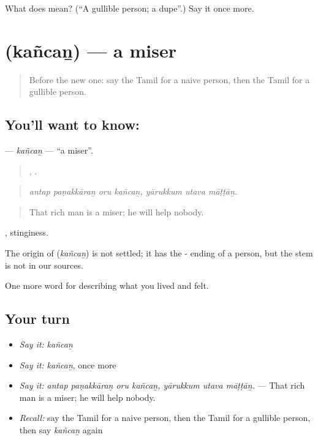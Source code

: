 \begin{tcolorbox}[breakable,colback=teal!4,colframe=teal!35!black,title={Before you move on}]
What does  mean? (\textquotedblleft{}A gullible person; a dupe\textquotedblright{}.) Say it once more.
\end{tcolorbox}
\section[\texorpdfstring{\ta{கஞ்சன்} (kañcaṉ)}{கஞ்சன் (kañcaṉ)}]{ (kañcaṉ) — a miser}

\label{lesson:TA-C472-kancan}



\begin{quote}
Before the new one: say the Tamil for a naive person, then the Tamil for a gullible person.
\end{quote}

\subsection*{You'll want to know: }
\textbf{} — \emph{kañcaṉ} — \textquotedblleft{}a miser\textquotedblright{}.

\begin{quote}
   ,   .
\end{quote}

\begin{quote}
\emph{antap paṇakkāraṉ oru kañcaṉ, yārukkum utava māṭṭāṉ.}
\end{quote}

\begin{quote}
That rich man is a miser; he will help nobody.
\end{quote}

, stinginess.

\begin{cousinweb}
The origin of \textbf{} (\emph{kañcaṉ}) is not settled; it has the - ending of a person, but the stem is not in our sources.
\end{cousinweb}

\begin{grammarlens}[title={What you've built}]
One more word for describing what you lived and felt.
\end{grammarlens}

\subsection*{Your turn}
\begin{itemize}
\raggedright
  \item \emph{Say it:} \emph{kañcaṉ}
  \item \emph{Say it:} \emph{kañcaṉ}, once more
  \item \emph{Say it:} \emph{antap paṇakkāraṉ oru kañcaṉ, yārukkum utava māṭṭāṉ.} — That rich man is a miser; he will help nobody.
  \item \emph{Recall:} say the Tamil for a naive person, then the Tamil for a gullible person, then say \emph{kañcaṉ} again
\end{itemize}

